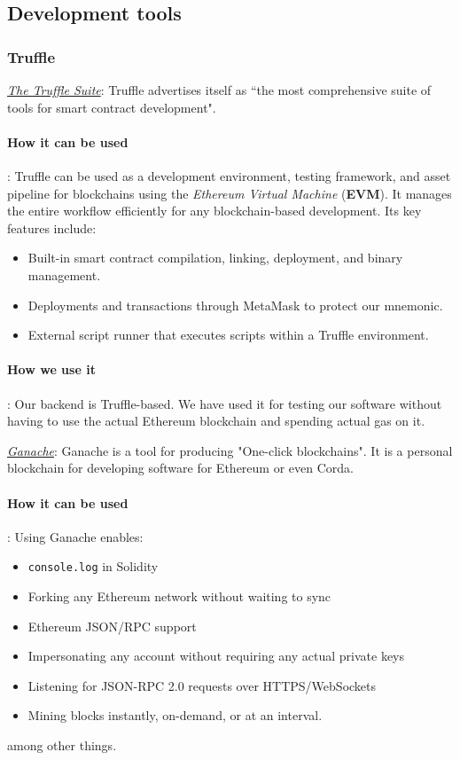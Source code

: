 \documentclass{article}
\begin{document}
\subsection{Development tools} 

\subsubsection{Truffle}

\href{https://trufflesuite.com/}{\textit{The Truffle Suite}}:
Truffle advertises itself as ``the most comprehensive suite of tools for smart
contract development". 
\paragraph{How it can be used}:
Truffle can be used as a development environment, testing framework, and asset
pipeline for blockchains using the \emph{Ethereum Virtual Machine} (\textbf{EVM}).
It manages the entire workflow efficiently for any blockchain-based development.
Its key features include:
\begin{itemize}
    \item Built-in smart contract compilation, linking, deployment, and binary management.
    \item Deployments and transactions through MetaMask to protect our mnemonic.
    \item External script runner that executes scripts within a Truffle environment.
\end{itemize}
\paragraph{How we use it}:
Our backend is Truffle-based. We have used it for testing our software without having to use the actual Ethereum blockchain and spending actual gas on it.

\href{https://trufflesuite.com/ganache/}{\textit{Ganache}}:
Ganache is a tool for producing "One-click blockchains". It is a personal blockchain for developing software for Ethereum or even Corda. 
\paragraph{How it can be used}:
Using Ganache enables:
\begin{itemize}
    \item \verb|console.log| in Solidity
    \item Forking any Ethereum network without waiting to sync
    \item Ethereum JSON/RPC support
    \item Impersonating any account without requiring any actual private keys
    \item Listening for JSON-RPC 2.0 requests over HTTPS/WebSockets
    \item Mining blocks instantly, on-demand, or at an interval.
\end{itemize}
among other things.
\end{document}
